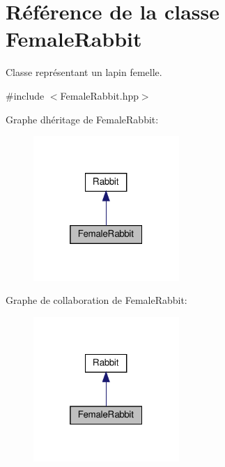 \hypertarget{classFemaleRabbit}{}\section{Référence de la classe Female\+Rabbit}
\label{classFemaleRabbit}


Classe représentant un lapin femelle.  




{\ttfamily \#include $<$Female\+Rabbit.\+hpp$>$}



Graphe d\textquotesingle{}héritage de Female\+Rabbit\+:
\nopagebreak
\begin{figure}[H]
\begin{center}
\leavevmode
\includegraphics[width=157pt]{classFemaleRabbit__inherit__graph}
\end{center}
\end{figure}


Graphe de collaboration de Female\+Rabbit\+:
\nopagebreak
\begin{figure}[H]
\begin{center}
\leavevmode
\includegraphics[width=157pt]{classFemaleRabbit__coll__graph}
\end{center}
\end{figure}
